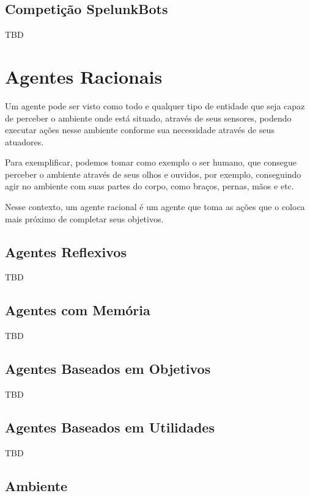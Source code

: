 \subsection{Competição SpelunkBots}

TBD

\section{Agentes Racionais}

Um agente pode ser visto como todo e qualquer tipo de entidade que seja capaz de
perceber o ambiente onde está situado, através de seus sensores, podendo
executar ações nesse ambiente conforme sua necessidade através de seus
atuadores.
\cite{Russell:1995:AIM:193191}

Para exemplificar, podemos tomar como exemplo o ser humano, que consegue
perceber o ambiente através de seus olhos e ouvidos, por exemplo, conseguindo
agir no ambiente com suas partes do corpo, como braços, pernas, mãos e etc.
\cite{Russell:1995:AIM:193191}

Nesse contexto, um agente racional é um agente que toma as ações que o coloca
mais próximo de completar seus objetivos.

\subsection{Agentes Reflexivos}

TBD

\subsection{Agentes com Memória}

TBD

\subsection{Agentes Baseados em Objetivos}

TBD

\subsection{Agentes Baseados em Utilidades}

TBD

\subsection{Ambiente}

